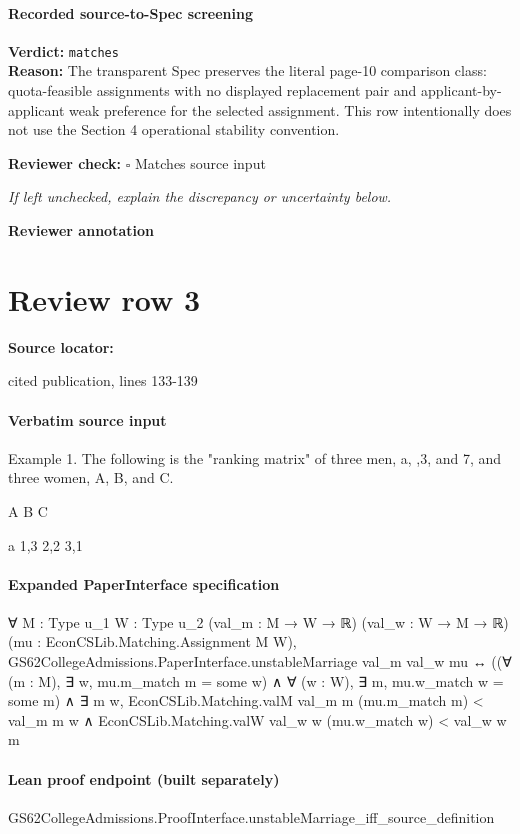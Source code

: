 \documentclass[10pt]{article}
\newcommand{\reviewerbox}{%
  \par\noindent\fbox{\parbox{0.96\linewidth}{\rule{0pt}{0.38in}}}\par
}
\newcommand{\reviewmatch}[1]{%
  \par\noindent\textbf{Reviewer check:} $\square$\; #1\par
  \noindent\emph{If left unchecked, explain the discrepancy or uncertainty below.}\par
}
\begin{document}
\paragraph{Recorded source-to-Spec screening}
\textbf{Verdict:} \texttt{matches}
\\
\textbf{Reason:} The transparent Spec preserves the literal page-10 comparison class: quota-feasible assignments with no displayed replacement pair and applicant-by-applicant weak preference for the selected assignment. This row intentionally does not use the Section 4 operational stability convention.
\reviewmatch{Matches source input}
\noindent\textbf{Reviewer annotation}\par
\reviewerbox
\clearpage
\hypertarget{source-claim-f836a3d18eeab599}{}
\section*{Review row 3}
\textbf{Source locator:} {\footnotesize\raggedright cited publication, lines 133-\allowbreak{}139\par}
\paragraph{Verbatim source input}
\begin{ReviewVerbatim}
Example 1. The following is the "ranking matrix" of three men, a, ,3, and 7,
and three women, A, B, and C.

                                        A        B       C

                              a 1,3 2,2 3,1
\end{ReviewVerbatim}


\paragraph{Expanded PaperInterface specification}
\begin{ReviewVerbatim}
∀ {M : Type u_1} {W : Type u_2} (val_m : M → W → ℝ) (val_w : W → M → ℝ) (mu : EconCSLib.Matching.Assignment M W),
  GS62CollegeAdmissions.PaperInterface.unstableMarriage val_m val_w mu ↔
    ((∀ (m : M), ∃ w, mu.m_match m = some w) ∧ ∀ (w : W), ∃ m, mu.w_match w = some m) ∧
      ∃ m w,
        EconCSLib.Matching.valM val_m m (mu.m_match m) < val_m m w ∧
          EconCSLib.Matching.valW val_w w (mu.w_match w) < val_w w m
\end{ReviewVerbatim}

\paragraph{Lean proof endpoint (built separately)}\begin{ReviewVerbatim}
GS62CollegeAdmissions.ProofInterface.unstableMarriage_iff_source_definition
\end{ReviewVerbatim}
\end{document}
